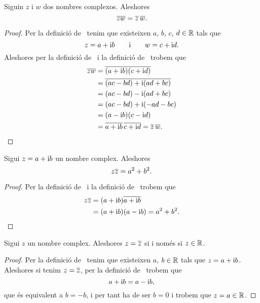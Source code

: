 \documentclass[../Apunts.tex]{subfiles}
\begin{document}
	\begin{proposition}
		\label{prop:el conjugat del producte és el producte de conjugats}
		Siguin \(z\) i \(w\) dos nombres complexos. Aleshores
		\[\overline{zw}=\overline{z}\,\overline{w}.\]
		\begin{proof}
			Per la definició de~ tenim que existeixen \(a\), \(b\), \(c\), \(d\in\mathbb{R}\) tals que
			\[z=a+\mathrm{i} b\qquad\text{i}\qquad w=c+\mathrm{i} d.\]
			Aleshores per la definició de~ i la definició de~ trobem que
			\begin{align*}
				\overline{zw}&=\overline{(a+\mathrm{i} b)(c+\mathrm{i} d)} \\
				&=\overline{(ac-bd)+\mathrm{i}(ad+bc)} \\
				&=(ac-bd)-\mathrm{i}(ad+bc) \\
				&=(ac-bd)+\mathrm{i}(-ad-bc) \\
				&=(a-\mathrm{i} b)(c-\mathrm{i} d) \\
				&=\overline{a+\mathrm{i} b}\,\overline{c+\mathrm{i} d}=\overline{z}\,\overline{w}\qedhere.
			\end{align*}
		\end{proof}
	\end{proposition}
	\begin{proposition}
		\label{prop:el producte d'un nombre complex pel seu conjugat és la suma dels quadrats de la seva part real i imaginaria}
		Sigui \(z=a+\mathrm{i} b\) un nombre complex. Aleshores
		\[z\overline{z}=a^{2}+b^{2}.\]
		\begin{proof}
			Per la definició de~ i la definició de~ trobem que
			\begin{align*}
				z\overline{z}&=(a+\mathrm{i} b)\overline{a+\mathrm{i} b} \\
				&=(a+\mathrm{i} b)(a-\mathrm{i} b)=a^{2}+b^{2}.\qedhere
			\end{align*}
		\end{proof}
	\end{proposition}
	\begin{proposition}
		\label{prop:un nombre complex és igual al seu conjugat si i només si és un real}
		Sigui \(z\) un nombre complex. Aleshores \(z=\overline{z}\) si i només si \(z\in\mathbb{R}\).
		\begin{proof}
			Per la definició de~ tenim que existeixen \(a\), \(b\in\mathbb{R}\) tals que \(z=a+\mathrm{i} b\). Aleshores si tenim \(z=\overline{z}\), per la definició de~ trobem que
			\[a+\mathrm{i} b=a-\mathrm{i} b,\]
			que és equivalent a \(b=-b\), i per tant ha de ser \(b=0\) i trobem que \(z=a\in\mathbb{R}\).
		\end{proof}
	\end{proposition}
\end{document}
